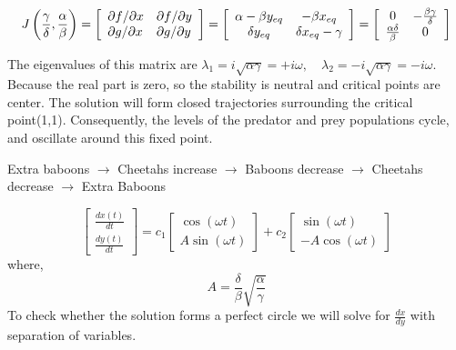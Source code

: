 \documentclass{article}
\begin{document}
\begin{equation*}
    J \left( \frac { \gamma } { \delta } , \frac { \alpha } { \beta } \right) = \left[ \begin{array} { l l } \partial f / \partial x & \partial f / \partial y \\ \partial g / \partial x & \partial g / \partial y \end{array} \right] = \left[ \begin{array} { c c } \alpha - \beta y_{eq} & - \beta x_{eq} \\ \delta y_{eq} & \delta x_{eq} - \gamma \end{array} \right] = \left[ \begin{array} { c c } 0 & - \frac { \beta \gamma } { \delta } \\ \frac { \alpha \delta } { \beta } & 0 \end{array} \right]
\end{equation*}


The eigenvalues of this matrix are
$ \lambda _ { 1 } = i \sqrt { \alpha \gamma } = +i \omega , \quad \lambda _ { 2 } = - i \sqrt { \alpha \gamma } = - i \omega. $
Because the real part is zero, so the stability is neutral and critical points are center. The solution will form closed trajectories surrounding the critical point(1,1). Consequently, the levels of
the predator and prey populations cycle, and oscillate around this fixed point.

Extra baboons $ \rightarrow $ Cheetahs increase $ \rightarrow $ Baboons decrease $ \rightarrow $ Cheetahs decrease $ \rightarrow $ Extra Baboons

\begin{equation*}
     \left[\begin{array} { c } \frac { d x ( t ) } { d t } \\ \frac { d y ( t ) } { d t } \end{array} \right] = c _ { 1 } \left[\begin{array} { c } \cos ( \omega t ) \\ A \sin ( \omega t ) \end{array} \right] + c _ { 2 } \left[ \begin{array} { c } \sin ( \omega t ) \\ - A \cos ( \omega t ) \end{array} \right]
\end{equation*}
where,
\begin{equation*}
    A = \frac { \delta } { \beta } \sqrt { \frac { \alpha } { \gamma } }
\end{equation*}
To check whether the solution forms a perfect circle we will solve for $ \frac { d x} { d y } $ with separation of variables.
\end{document}
